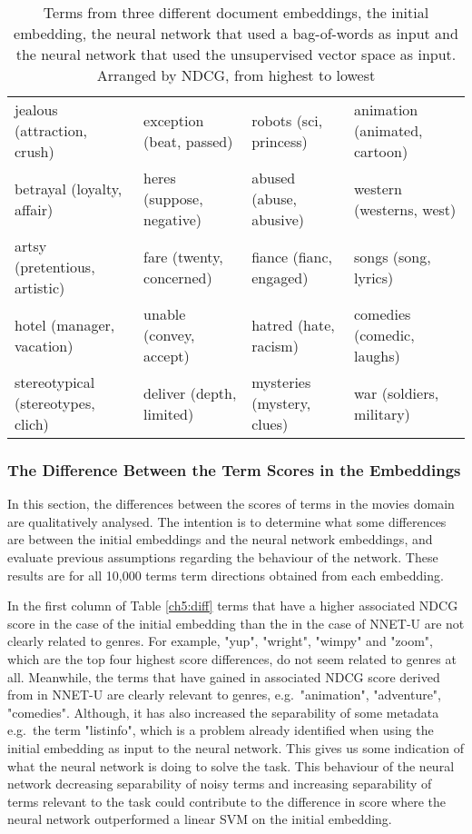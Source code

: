 \begin{table}[]
\begin{tabular}{L{3.8cm}L{3.8cm}L{3.8cm}L{3.8cm}}
jealous (attraction, crush)          & exception (beat, passed)                    & robots (sci, princess)                 & animation (animated, cartoon)              \\
betrayal (loyalty, affair)           & heres (suppose, negative)                   & abused (abuse, abusive)                & western (westerns, west)                   \\
artsy (pretentious, artistic)        & fare (twenty, concerned)                    & fiance (fianc, engaged)                & songs (song, lyrics)                       \\
hotel (manager, vacation)            & unable (convey, accept)                     & hatred (hate, racism)                  & comedies (comedic, laughs)                 \\
stereotypical (stereotypes, clich)   & deliver (depth, limited)                    & mysteries (mystery, clues)             & war (soldiers, military)                   \\                                   
	\end{tabular}\caption{Terms from three different document embeddings, the initial embedding, the neural network that used a bag-of-words as input and the neural network that used the unsupervised vector space as input. Arranged by NDCG, from highest to lowest}
\end{table}


\subsubsection{The Difference Between the Term Scores in the Embeddings}\label{ch5:diffsection}

In this section, the differences between the scores of terms in the movies domain are qualitatively analysed. The intention is to determine what some differences are between the initial embeddings and the neural network embeddings, and evaluate previous assumptions regarding the behaviour of the network. These results are for all 10,000 terms term directions obtained from each embedding. 

In the first column of  Table \ref{ch5:diff} terms that have a higher associated NDCG score in the case of the initial embedding than the in the case of NNET-U are not clearly related to genres. For example, "yup", "wright", "wimpy" and "zoom", which are the top four highest score differences, do not seem related to genres at all. Meanwhile, the terms that have gained in associated NDCG score derived from in NNET-U are clearly relevant to genres, e.g.\ "animation", "adventure", "comedies". Although, it has also increased the separability of some metadata e.g.\ the term "listinfo", which is a problem already identified when using the initial embedding as input to the neural network. This gives us some indication of what the neural network is doing to solve the task. This behaviour of the neural network decreasing separability of noisy terms and increasing separability of terms relevant to the task could contribute to the difference in score where the neural network outperformed a linear SVM on the initial embedding. 

